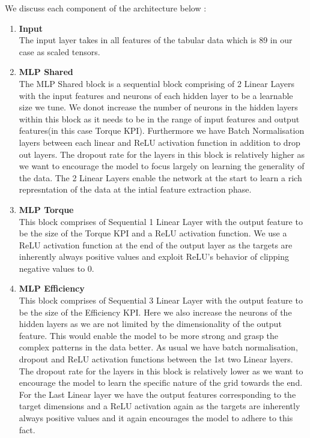 \documentclass{report} %
\begin{document}
We discuss each component of the architecture below :
\begin{enumerate}
    \item \textbf{Input} \\
    The input layer takes in all features of the tabular data which is 89 in our case as scaled tensors.
    \item \textbf{MLP Shared} \\
    The MLP Shared block is a sequential block comprising of 2 Linear Layers with the input features and neurons of each hidden layer to be a learnable size we tune.
    We donot increase the number of neurons in the hidden layers within this block as it needs to be in the range of input features and output features(in this case Torque \ac{KPI}).
    Furthermore we have Batch Normalisation layers between each linear and \ac{ReLU} activation function in addition to drop out layers.
    The dropout rate for the layers in this block is relatively higher as we want to encourage the model to focus largely on learning the generality of the data.
    The 2 Linear Layers enable the network at the start to learn a rich represntation of the data at the intial feature extraction phase.
    \item \textbf{MLP Torque} \\
    This block comprises of Sequential 1 Linear Layer with the output feature to be the size of the Torque \ac{KPI} and a \ac{ReLU} activation function.
    We use a \ac{ReLU} activation function at the end of the output layer as the targets are inherently always positive values and exploit \ac{ReLU}'s behavior of clipping negative values to 0.
    \item \textbf{MLP Efficiency} \\
    This block comprises of Sequential 3 Linear Layer with the output feature to be the size of the Efficiency \ac{KPI}.
    Here we also increase the neurons of the hidden layers as we are not limited by the dimensionality of the output feature.
    This would enable the model to be more strong and grasp the complex patterns in the data better.
    As usual we have batch normalisation, dropout and \ac{ReLU} activation functions between the 1st two Linear layers.
    The dropout rate for the layers in this block is relatively lower as we want to encourage the model to learn the specific nature of the grid towards the end.
    For the Last Linear layer we have the output features corresponding to the target dimensions and a \ac{ReLU} activation again as the targets are inherently always positive values and it again encourages the model to adhere to this fact.

\end{enumerate}
\end{document}
